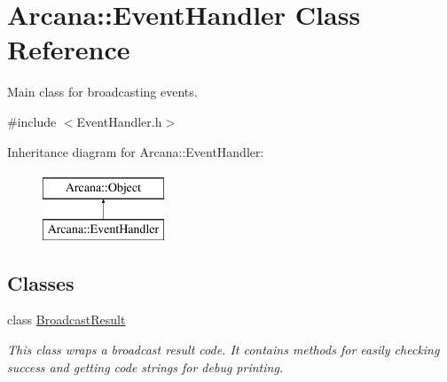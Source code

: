 \hypertarget{class_arcana_1_1_event_handler}{}\section{Arcana\+:\+:Event\+Handler Class Reference}
\label{class_arcana_1_1_event_handler}


Main class for broadcasting events.  




{\ttfamily \#include $<$Event\+Handler.\+h$>$}

Inheritance diagram for Arcana\+:\+:Event\+Handler\+:\begin{figure}[H]
\begin{center}
\leavevmode
\includegraphics[height=2.000000cm]{class_arcana_1_1_event_handler}
\end{center}
\end{figure}
\subsection*{Classes}
\begin{DoxyCompactItemize}
\item 
class \mbox{\hyperlink{class_arcana_1_1_event_handler_1_1_broadcast_result}{Broadcast\+Result}}
\begin{DoxyCompactList}\small\item\em This class wraps a broadcast result code. It contains methods for easily checking success and getting code strings for debug printing. \end{DoxyCompactList}\end{DoxyCompactItemize}
